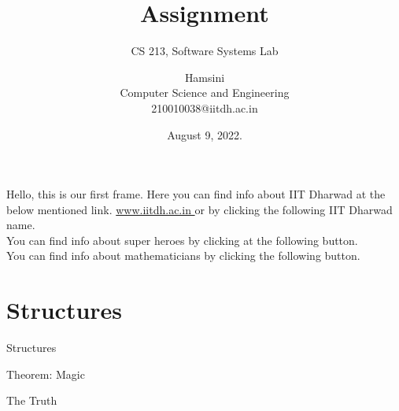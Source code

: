 \documentclass{beamer}
\title{Assignment}
\author[]{Hamsini \\ 
Computer Science and Engineering \\ 
210010038@iitdh.ac.in}
\subtitle{CS 213, Software Systems Lab}
\date{ August 9, 2022.}
\institute[CSE, IIT Dharwad]{Indian Institute of Technology, Dharwad}
\begin{document}
\frame[plain]{\titlepage}

\begin{frame}[label=page_2]
    Hello, this is our first frame. Here you can find info about IIT Dharwad at the below mentioned link. \url{www.iitdh.ac.in } or by clicking the following IIT Dharwad name.\\
You can find info about super heroes by clicking at the following button. 
\hyperlink{page_22}{}\\
You can find info about mathematicians by clicking the following button.
\hyperlink{page_21}{}

\end{frame}

\section{Structures}

\begin{frame}{Structures}
\begin{block}{Theorem: Magic}
\end{block}
\begin{alertblock}{The Truth}
\end{alertblock}
\end{frame}
\end{document}
